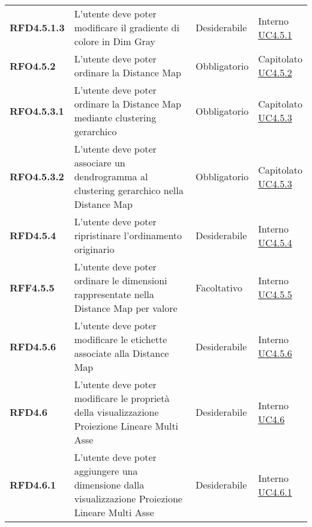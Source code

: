 \begin{longtable}[H]{| >{\raggedright\bfseries}m{20mm} | >{\raggedright}m{90mm} | >{\centering}m{25mm} | >{\centering\arraybackslash}m{30mm}|}
    RFD4.5.1.3
    & L'utente deve poter modificare il gradiente di colore in Dim Gray
    & Desiderabile
    & \makecell{ Interno \\ \hyperref[par:uc4.5.1]{UC4.5.1} }\\

    RFO4.5.2
    & L'utente deve poter ordinare la Distance Map
    & Obbligatorio
    & \makecell{ Capitolato \\ \hyperref[par:uc4.5.2]{UC4.5.2} }\\

    RFO4.5.3.1
    & L'utente deve poter ordinare la Distance Map mediante clustering gerarchico
    & Obbligatorio
    & \makecell{ Capitolato \\ \hyperref[par:uc4.5.3]{UC4.5.3} }\\

    RFO4.5.3.2
    & L'utente deve poter associare un dendrogramma al clustering gerarchico nella Distance Map
    & Obbligatorio
    & \makecell{ Capitolato \\ \hyperref[par:uc4.5.3]{UC4.5.3} }\\

    RFD4.5.4
    & L'utente deve poter ripristinare l'ordinamento originario
    & Desiderabile
    & \makecell{ Interno \\ \hyperref[par:uc4.5.4]{UC4.5.4} }\\

    RFF4.5.5
    & L'utente deve poter ordinare le dimensioni rappresentate nella Distance Map per valore
    & Facoltativo
    & \makecell{ Interno \\ \hyperref[par:uc4.5.5]{UC4.5.5} }\\

    RFD4.5.6
    & L'utente deve poter modificare le etichette associate alla Distance Map
    & Desiderabile
    & \makecell{ Interno \\ \hyperref[par:uc4.5.6]{UC4.5.6} }\\

    RFD4.6
    & L'utente deve poter modificare le proprietà della visualizzazione Proiezione Lineare Multi Asse
    & Desiderabile
    & \makecell{ Interno \\  \hyperref[ssub:uc4.6]{UC4.6} }\\

    RFD4.6.1
    & L'utente deve poter aggiungere una dimensione dalla visualizzazione Proiezione Lineare Multi Asse
    & Desiderabile
    & \makecell{ Interno \\  \hyperref[par:uc4.6.1]{UC4.6.1} }\\


\end{longtable}
